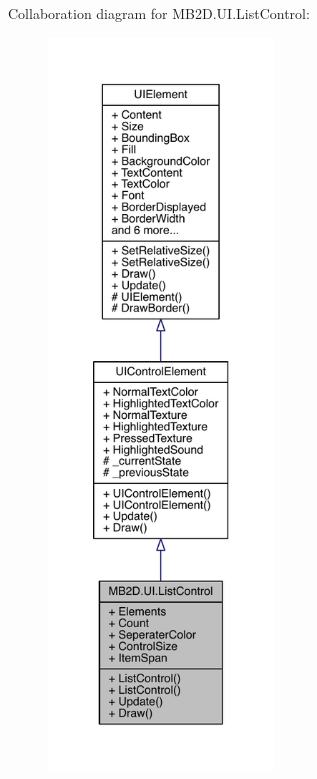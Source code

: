 Collaboration diagram for M\+B2\+D.\+U\+I.\+List\+Control\+:\nopagebreak
\begin{figure}[H]
\begin{center}
\leavevmode
\includegraphics[height=550pt]{class_m_b2_d_1_1_u_i_1_1_list_control__coll__graph}
\end{center}
\end{figure}
